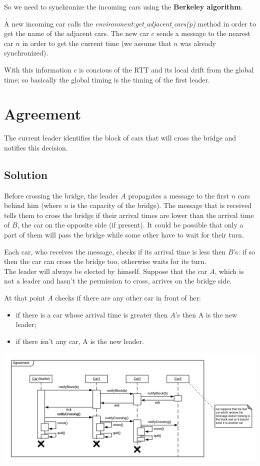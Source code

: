 So we need to synchronize the incoming cars using the \textbf{Berkeley algorithm}.

A new incoming car calls the \textit{environment:get$\_$adjacent$\_$cars(p)} 
method in order to get the name of the adjacent cars. 
The new car $c$ sends a message to the nearest car $n$ in order to get the current time 
(we assume that $n$ was already synchronized). 

With this information $c$ is concious of the RTT and its local drift from the global time;
so basically the global timing is the timing of the first leader. 


\section{Agreement}

The current leader identifies the block of cars that will cross the bridge and notifies
this decision.  

\subsection{Solution}

Before crossing the bridge, the leader $A$ propagates a message to 
the first $n$ cars behind him (where $n$ is the capacity of the bridge). The message that is received 
tells them to cross the bridge if their arrival times are lower than the 
arrival time of $B$, the car on the opposite side (if present). It could be possible that only a part
of them will pass the bridge while some other have to wait for their turn.

Each car, who receives the message, checks if its arrival time is less then $B$'s: 
if so then the car can cross the bridge too, otherwise waits for its turn.\\

\noindent
The leader will always be elected by himself. Suppose that the car $A$, 
which is not a leader and hasn't the permission to cross, arrives on the bridge side.

At that point $A$ checks if there are any other car in front of her:
\begin{itemize}
\item if there is a car whose arrival time is greater then $A$'s then A 
    is the new leader;
\item if there isn't any car, A is the new leader.
\end{itemize}

\begin{center}
    \includegraphics[scale=0.6]{assets/ds2019_3.png}
\end{center}


